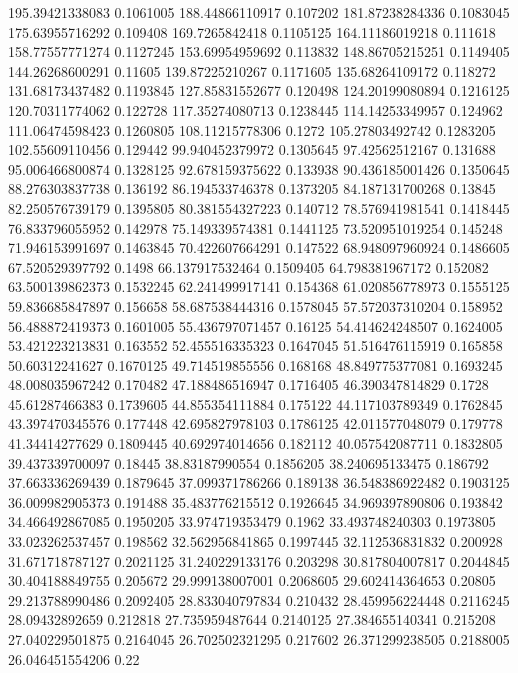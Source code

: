 195.39421338083 0.1061005
188.44866110917 0.107202
181.87238284336 0.1083045
175.63955716292 0.109408
169.7265842418 0.1105125
164.11186019218 0.111618
158.77557771274 0.1127245
153.69954959692 0.113832
148.86705215251 0.1149405
144.26268600291 0.11605
139.87225210267 0.1171605
135.68264109172 0.118272
131.68173437482 0.1193845
127.85831552677 0.120498
124.20199080894 0.1216125
120.70311774062 0.122728
117.35274080713 0.1238445
114.14253349957 0.124962
111.06474598423 0.1260805
108.11215778306 0.1272
105.27803492742 0.1283205
102.55609110456 0.129442
99.940452379972 0.1305645
97.42562512167 0.131688
95.006466800874 0.1328125
92.678159375622 0.133938
90.436185001426 0.1350645
88.276303837738 0.136192
86.194533746378 0.1373205
84.187131700268 0.13845
82.250576739179 0.1395805
80.381554327223 0.140712
78.576941981541 0.1418445
76.833796055952 0.142978
75.149339574381 0.1441125
73.520951019254 0.145248
71.946153991697 0.1463845
70.422607664291 0.147522
68.948097960924 0.1486605
67.520529397792 0.1498
66.137917532464 0.1509405
64.798381967172 0.152082
63.500139862373 0.1532245
62.241499917141 0.154368
61.020856778973 0.1555125
59.836685847897 0.156658
58.687538444316 0.1578045
57.572037310204 0.158952
56.488872419373 0.1601005
55.436797071457 0.16125
54.414624248507 0.1624005
53.421223213831 0.163552
52.455516335323 0.1647045
51.516476115919 0.165858
50.60312241627 0.1670125
49.714519855556 0.168168
48.849775377081 0.1693245
48.008035967242 0.170482
47.188486516947 0.1716405
46.390347814829 0.1728
45.61287466383 0.1739605
44.855354111884 0.175122
44.117103789349 0.1762845
43.397470345576 0.177448
42.695827978103 0.1786125
42.011577048079 0.179778
41.34414277629 0.1809445
40.692974014656 0.182112
40.057542087711 0.1832805
39.437339700097 0.18445
38.83187990554 0.1856205
38.240695133475 0.186792
37.663336269439 0.1879645
37.099371786266 0.189138
36.548386922482 0.1903125
36.009982905373 0.191488
35.483776215512 0.1926645
34.969397890806 0.193842
34.466492867085 0.1950205
33.974719353479 0.1962
33.493748240303 0.1973805
33.023262537457 0.198562
32.562956841865 0.1997445
32.112536831832 0.200928
31.671718787127 0.2021125
31.240229133176 0.203298
30.817804007817 0.2044845
30.404188849755 0.205672
29.999138007001 0.2068605
29.602414364653 0.20805
29.213788990486 0.2092405
28.833040797834 0.210432
28.459956224448 0.2116245
28.09432892659 0.212818
27.735959487644 0.2140125
27.384655140341 0.215208
27.040229501875 0.2164045
26.702502321295 0.217602
26.371299238505 0.2188005
26.046451554206 0.22

